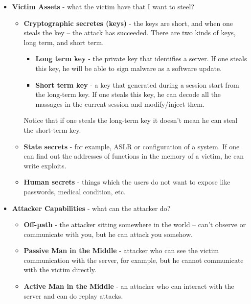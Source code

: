 \begin{itemize}
    \item \textbf{Victim Assets} - what the victim have that I want to steel? 
        \begin{itemize}
            \item \textbf{Cryptographic secretes (keys)} -  the keys are short,
            and when one steals the key – the attack has succeeded. There are
            two kinds of keys, long term, and short term.
                \begin{itemize}
                    \item \textbf{Long term key } - the private key that
                    identifies a server. If one steals this key, he will be able
                    to sign malware as a software update.
                    \item \textbf{Short term key} - a key that generated during
                    a session start from the long-term key. If one steals this
                    key, he can decode all the massages in the current session
                    and modify/inject them.
                \end{itemize}
                Notice that if one steals the long-term key it doesn't mean he
                can steal the short-term key.
            \item \textbf{State secrets} - for example, ASLR or configuration of
            a system. If one can find out the addresses of functions in the
            memory of a victim, he can write exploits. 
            \item \textbf{Human secrets} - things which the users do not want to
            expose like passwords, medical condition, etc.
        \end{itemize}
    \item \textbf{Attacker Capabilities} - what can the attacker do?
        \begin{itemize}
            \item \textbf{Off-path} - the attacker sitting somewhere in the
            world – can't observe or communicate with you, but he can attack you
            somehow. 
            \item \textbf{Passive Man in the Middle} - attacker who can see the
            victim communication with the server, for example, but he cannot
            communicate with the victim directly.
            \item \textbf{Active Man in the Middle} - an attacker who can
            interact with the server and can do replay attacks.

\end{itemize}
\end{itemize}
